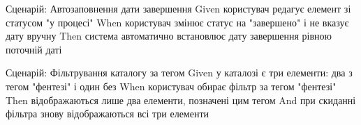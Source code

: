 \begin{codelisting}
\caption{Автозаповнення дати завершення}
\label{lst:bdd-date}
\begin{skedcode}
Сценарій: Автозаповнення дати завершення
  Given користувач редагує елемент зі статусом "у процесі"
  When користувач змінює статус на "завершено"
    і не вказує дату вручну
  Then система автоматично встановлює дату завершення рівною
    поточній даті
\end{skedcode}
\end{codelisting}

\begin{codelisting}
\caption{Фільтрування за тегом}
\label{lst:bdd-tag}
\begin{skedcode}
Сценарій: Фільтрування каталогу за тегом
  Given у каталозі є три елементи: два з тегом "фентезі" і один без
  When користувач обирає фільтр за тегом "фентезі"
  Then відображаються лише два елементи, позначені цим тегом
  And при скиданні фільтра знову відображаються всі три елементи
\end{skedcode}
\end{codelisting}
